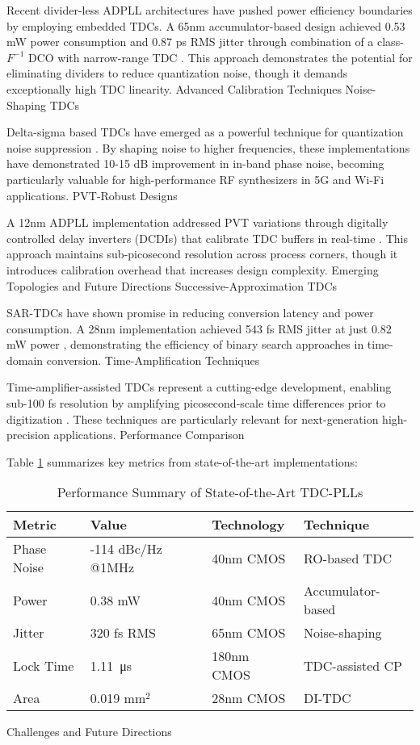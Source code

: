 Recent divider-less ADPLL architectures have pushed power efficiency boundaries by employing embedded TDCs. A 65nm accumulator-based design achieved 0.53 mW power consumption and 0.87 ps RMS jitter through combination of a class-$F^{-1}$ DCO with narrow-range TDC \cite{low_power_2024}. This approach demonstrates the potential for eliminating dividers to reduce quantization noise, though it demands exceptionally high TDC linearity.
Advanced Calibration Techniques
Noise-Shaping TDCs

Delta-sigma based TDCs have emerged as a powerful technique for quantization noise suppression \cite{noise_shaping_2023}. By shaping noise to higher frequencies, these implementations have demonstrated 10-15 dB improvement in in-band phase noise, becoming particularly valuable for high-performance RF synthesizers in 5G and Wi-Fi applications.
PVT-Robust Designs

A 12nm ADPLL implementation addressed PVT variations through digitally controlled delay inverters (DCDIs) that calibrate TDC buffers in real-time \cite{pvt_robust_2024}. This approach maintains sub-picosecond resolution across process corners, though it introduces calibration overhead that increases design complexity.
Emerging Topologies and Future Directions
Successive-Approximation TDCs

SAR-TDCs have shown promise in reducing conversion latency and power consumption. A 28nm implementation achieved 543 fs RMS jitter at just 0.82 mW power \cite{sar_tdc_2023}, demonstrating the efficiency of binary search approaches in time-domain conversion.
Time-Amplification Techniques

Time-amplifier-assisted TDCs represent a cutting-edge development, enabling sub-100 fs resolution by amplifying picosecond-scale time differences prior to digitization \cite{time_amp_2024}. These techniques are particularly relevant for next-generation high-precision applications.
Performance Comparison

Table \ref{tab:performance} summarizes key metrics from state-of-the-art implementations:

\begin{table}[h]
\centering
\caption{Performance Summary of State-of-the-Art TDC-PLLs}
\label{tab:performance}
\begin{tabular}{llll}
\hline
\textbf{Metric} & \textbf{Value} & \textbf{Technology} & \textbf{Technique} \\
\hline
Phase Noise & -114 dBc/Hz @1MHz & 40nm CMOS & RO-based TDC \\
Power & 0.38 mW & 40nm CMOS & Accumulator-based \\
Jitter & 320 fs RMS & 65nm CMOS & Noise-shaping \\
Lock Time & \SI{1.11}{\micro\second} & 180nm CMOS & TDC-assisted CP \\
Area & 0.019 mm$^2$ & 28nm CMOS & DI-TDC \\
\hline
\end{tabular}
\end{table}
Challenges and Future Directions

